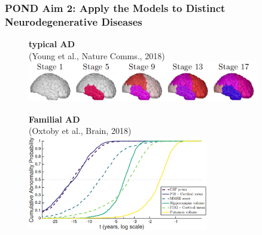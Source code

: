 \documentclass[8pt,xcolor=table]{beamer}
\begin{document}
\begin{frame}
\frametitle{POND Aim 2: Apply the Models to Distinct Neurodegenerative Diseases}

\newcommand{\mnpHeight}{3cm}

\vspace{-3em}
  
  
  \hspace{-2em}
  \begin{small}
  \begin{figure}[h]
  \centering
  
      \begin{minipage}[t][\mnpHeight][t]{0.49\linewidth}
    \centering
    \textbf{typical AD}\\ \footnotesize{(Young et al., Nature Comms., 2018)}
    \includegraphics[width=0.9\textwidth]{young_progression.png}
  \end{minipage}
  \begin{minipage}[t][\mnpHeight][t]{0.49\linewidth}
    \centering
    \textbf{Familial AD}\\ \footnotesize{(Oxtoby et al., Brain, 2018)}
    \includegraphics[width=0.7\textwidth,trim=0 0 0 0, clip]{neil_dian.png}
    
    \vspace{2em}
    
  \end{minipage}
  \vspace{2em}
  

\end{figure}
\end{small}
\end{frame}
\end{document}
